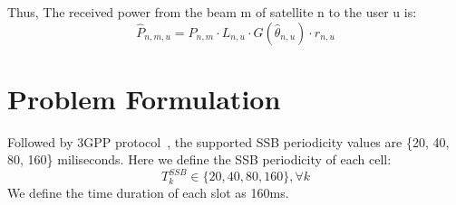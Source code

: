 Thus, The received power from the beam m of satellite n to the user u is:
\begin{equation}
    \hat{P}_{n,m,u} = P_{n,m} \cdot L_{n,u} \cdot G(\hat\theta_{n,u}) \cdot r_{n,u}
\end{equation}

\section{Problem Formulation}

Followed by 3GPP protocol~\cite{38331}, the supported SSB periodicity values are 
\{20, 40, 80, 160\} miliseconds. Here we define the SSB periodicity of each cell:
\begin{equation}
    T^{SSB}_{k}\in\{20, 40, 80, 160\}, \forall k
\end{equation}
We define the time duration of each slot as 160ms. 


    

